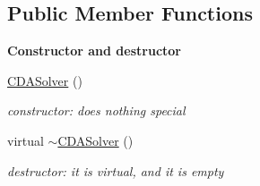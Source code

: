 \subsection*{Public Member Functions}
\begin{Indent}\textbf{ Constructor and destructor}\par
\begin{DoxyCompactItemize}
\item 
\mbox{\label{class_s_m_spp__di__unipi__it_1_1_c_d_a_solver_ab38a252b96e5a6080c8e40e1f2869554}} 
\mbox{\hyperlink{class_s_m_spp__di__unipi__it_1_1_c_d_a_solver_ab38a252b96e5a6080c8e40e1f2869554}{C\+D\+A\+Solver}} ()
\begin{DoxyCompactList}\small\item\em constructor\+: does nothing special \end{DoxyCompactList}\item 
\mbox{\label{class_s_m_spp__di__unipi__it_1_1_c_d_a_solver_a9639ae2f9260a6412f9c87b3edbeab5a}} 
virtual \mbox{\hyperlink{class_s_m_spp__di__unipi__it_1_1_c_d_a_solver_a9639ae2f9260a6412f9c87b3edbeab5a}{$\sim$\+C\+D\+A\+Solver}} ()
\begin{DoxyCompactList}\small\item\em destructor\+: it is virtual, and it is empty \end{DoxyCompactList}\end{DoxyCompactItemize}
\end{Indent}
